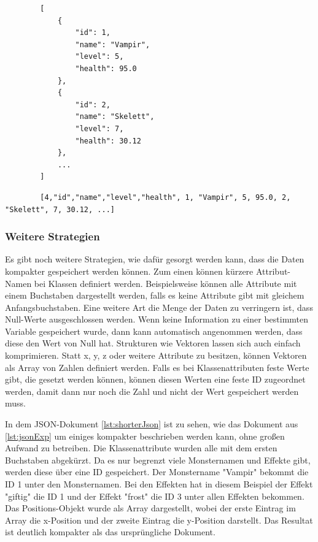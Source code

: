 \begin{listing}[htp]
    \begin{verbatim} 
        [
            {
                "id": 1,
                "name": "Vampir",
                "level": 5,
                "health": 95.0
            },
            {
                "id": 2,
                "name": "Skelett",
                "level": 7,
                "health": 30.12
            },
            ...
        ]                   
    \end{verbatim}
    \caption{}
    \label{lst:hpackJsonExp}
\end{listing}

\begin{listing}[htp]
    \begin{verbatim} 
        [4,"id","name","level","health", 1, "Vampir", 5, 95.0, 2, "Skelett", 7, 30.12, ...]                  
    \end{verbatim}
    \caption{}
    \label{lst:hpackCompressedExp}
\end{listing}

\subsubsection{Weitere Strategien}
Es gibt noch weitere Strategien, wie dafür gesorgt werden kann, dass die Daten kompakter gespeichert werden können. Zum einen können kürzere Attribut-Namen bei Klassen definiert werden. Beispielsweise können alle Attribute mit einem Buchstaben dargestellt werden, falls es keine Attribute gibt mit gleichem Anfangsbuchstaben. Eine weitere Art die Menge der Daten zu verringern ist, dass Null-Werte ausgeschlossen werden. Wenn keine Information zu einer bestimmten Variable gespeichert wurde, dann kann automatisch angenommen werden, dass diese den Wert von Null hat. Strukturen wie Vektoren lassen sich auch einfach komprimieren. Statt x, y, z oder weitere Attribute zu besitzen, können Vektoren als Array von Zahlen definiert werden. Falls es bei Klassenattributen feste Werte gibt, die gesetzt werden können, können diesen Werten eine feste ID zugeordnet werden, damit dann nur noch die Zahl und nicht der Wert gespeichert werden muss.\cite{objelean2011json}\cite{baeldungReducingJSON}

In dem JSON-Dokument \ref{lst:shorterJson} ist zu sehen, wie das Dokument aus \ref{lst:jsonExp} um einiges kompakter beschrieben werden kann, ohne großen Aufwand zu betreiben. Die Klassenattribute wurden alle mit dem ersten Buchstaben abgekürzt. Da es nur begrenzt viele Monsternamen und Effekte gibt, werden diese über eine ID gespeichert. Der Monstername "Vampir" bekommt die ID 1 unter den Monsternamen. Bei den Effekten hat in diesem Beispiel der Effekt "giftig" die ID 1 und der Effekt "frost" die ID 3 unter allen Effekten bekommen. Das Positions-Objekt wurde als Array dargestellt, wobei der erste Eintrag im Array die x-Position und der zweite Eintrag die y-Position darstellt. Das Resultat ist deutlich kompakter als das ursprüngliche Dokument.

